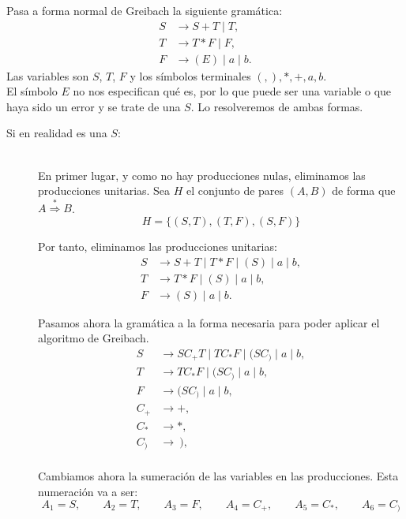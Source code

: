 \documentclass[12pt]{article}
\begin{document}
    \begin{ejercicio}[2.5 puntos]
        Pasa a forma normal de Greibach la siguiente gramática:
        \begin{align*}
            S &\to S + T \mid T, \\
            T &\to T * F \mid F, \\
            F &\to (E) \mid a \mid b.
        \end{align*}
        Las variables son $S$, $T$, $F$ y los símbolos terminales $(, ), *, +, a, b$.\\
        
        El símbolo $E$ no nos especifican qué es, por lo que puede ser una variable o que haya sido un error y se trate de una $S$. Lo resolveremos de ambas formas.
        \begin{description}
            \item[Si en realidad es una $S$:]~\\
            En primer lugar, y como no hay producciones nulas, eliminamos las producciones unitarias.
        Sea $H$ el conjunto de pares $(A,B)$ de forma que $A\stackrel{*}{\Rightarrow} B$.
        \begin{equation*}
            H=\{(S,T),(T,F),(S,F)\}
        \end{equation*}

        Por tanto, eliminamos las producciones unitarias:
        \begin{align*}
            S &\to S + T \mid T * F \mid (S) \mid a \mid b, \\
            T &\to T * F \mid (S) \mid a \mid b, \\
            F &\to (S) \mid a \mid b.
        \end{align*}

        Pasamos ahora la gramática a la forma necesaria para poder aplicar el algoritmo de Greibach.
        \begin{align*}
            S &\to S C_+ T \mid T C_* F \mid (SC_) \mid a \mid b, \\
            T &\to T C_* F \mid (SC_) \mid a \mid b, \\
            F &\to (SC_) \mid a \mid b,\\
            C_+ &\to +,\\
            C_* &\to *,\\
            C_{)} &\to~),\\
        \end{align*}

        Cambiamos ahora la sumeración de las variables en las producciones. Esta numeración va a ser:
        \begin{equation*}
            A_1=S,\qquad A_2=T,\qquad A_3=F,\qquad A_4=C_+,\qquad A_5=C_*,\qquad A_6=C_{)}
        \end{equation*}


\end{description}
\end{ejercicio}
\end{document}
